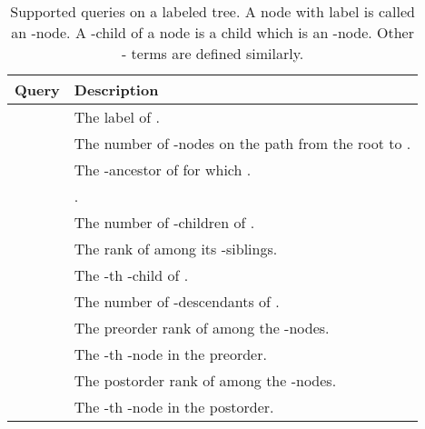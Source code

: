 \documentclass[12pt]{article}
\begin{document}
\begin{table}
\caption{Supported queries on a labeled tree.
A node with label  is called an -node.
A -child of a node is a child which is an -node.
Other - terms are defined similarly.
\label{tab:labeled-queries}}
\centering
\begin{tabular}{lp{11.4cm}}
\toprule
Query & Description \\
\midrule
 & The label of . \\
 & The number of -nodes on the path from
						the root to . \\
 & The -ancestor  of  for which
						. \\
 & . \\
 & The number of -children of . \\
 & The rank of  among its -siblings. \\
 & The -th -child of . \\
 & The number of -descendants of . \\
 & The preorder rank of  among
the -nodes. \\
 & The -th -node in the preorder. \\
 & The postorder rank of  among
the -nodes. \\
 & The -th -node in the postorder. \\
\bottomrule
\end{tabular}
\end{table}
\end{document}
